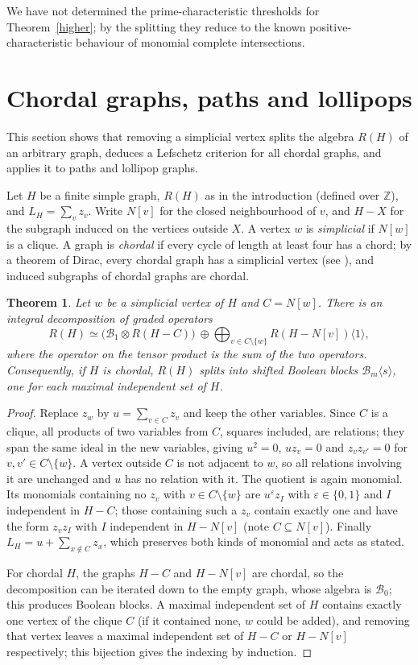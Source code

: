 \documentclass[11pt,a4paper]{article}
\newtheorem{theorem}{Theorem}[section]
\theoremstyle{definition}
\newcommand{\B}{\mathcal B}
\begin{document}
We have not determined the prime-characteristic thresholds for Theorem~\ref{higher}; by the splitting they reduce to the known positive-characteristic behaviour of monomial complete intersections.

\section{Chordal graphs, paths and lollipops}\label{sec:chordal}

This section shows that removing a simplicial vertex splits the algebra $R(H)$ of an arbitrary graph, deduces a Lefschetz criterion for all chordal graphs, and applies it to paths and lollipop graphs.

Let $H$ be a finite simple graph, $R(H)$ as in the introduction (defined over $\mathbb Z$), and $L_H=\sum_vz_v$. Write $N[v]$ for the closed neighbourhood of $v$, and $H-X$ for the subgraph induced on the vertices outside $X$. A vertex $w$ is \emph{simplicial} if $N[w]$ is a clique. A graph is \emph{chordal} if every cycle of length at least four has a chord; by a theorem of Dirac, every chordal graph has a simplicial vertex (see \cite[p.~851]{FG}), and induced subgraphs of chordal graphs are chordal.

\begin{theorem}\label{chordal}
Let $w$ be a simplicial vertex of $H$ and $C=N[w]$. There is an integral decomposition of graded operators
\[
 R(H)\simeq\big(\B_1\otimes R(H-C)\big)\ \oplus\bigoplus_{v\in C\setminus\{w\}}R(H-N[v])\langle1\rangle ,
\]
where the operator on the tensor product is the sum of the two operators. Consequently, if $H$ is chordal, $R(H)$ splits into shifted Boolean blocks $\B_m\langle s\rangle$, one for each maximal independent set of $H$.
\end{theorem}
\begin{proof}
Replace $z_w$ by $u=\sum_{v\in C}z_v$ and keep the other variables. Since $C$ is a clique, all products of two variables from $C$, squares included, are relations; they span the same ideal in the new variables, giving $u^2=0$, $uz_v=0$ and $z_vz_{v'}=0$ for $v,v'\in C\setminus\{w\}$. A vertex outside $C$ is not adjacent to $w$, so all relations involving it are unchanged and $u$ has no relation with it. The quotient is again monomial. Its monomials containing no $z_v$ with $v\in C\setminus\{w\}$ are $u^\varepsilon z_I$ with $\varepsilon\in\{0,1\}$ and $I$ independent in $H-C$; those containing such a $z_v$ contain exactly one and have the form $z_vz_I$ with $I$ independent in $H-N[v]$ (note $C\subseteq N[v]$). Finally $L_H=u+\sum_{x\notin C}z_x$, which preserves both kinds of monomial and acts as stated.

For chordal $H$, the graphs $H-C$ and $H-N[v]$ are chordal, so the decomposition can be iterated down to the empty graph, whose algebra is $\B_0$; this produces Boolean blocks. A maximal independent set of $H$ contains exactly one vertex of the clique $C$ (if it contained none, $w$ could be added), and removing that vertex leaves a maximal independent set of $H-C$ or $H-N[v]$ respectively; this bijection gives the indexing by induction.
\end{proof}
\end{document}
